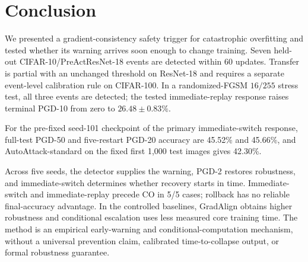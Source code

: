\section{Conclusion}
We presented a gradient-consistency safety trigger for catastrophic
overfitting and tested whether its warning arrives soon enough to change
training. Seven held-out CIFAR-10/PreActResNet-18 events are detected within
60 updates. Transfer is partial with an unchanged threshold on ResNet-18 and
requires a separate event-level calibration rule on CIFAR-100. In a randomized-FGSM
$16/255$ stress test, all three events are detected; the tested immediate-replay
response raises terminal PGD-10 from zero to $26.48\pm0.83\%$.

For the pre-fixed seed-101 checkpoint of the primary immediate-switch response,
full-test PGD-50 and five-restart PGD-20 accuracy are 45.52\% and 45.66\%, and
AutoAttack-standard on the fixed first 1,000 test images gives 42.30\%.

Across five seeds, the detector supplies the warning, PGD-2 restores
robustness, and immediate-switch determines whether recovery starts in time.
Immediate-switch and immediate-replay precede CO in 5/5 cases; rollback has no
reliable final-accuracy advantage. In the controlled
baselines, GradAlign obtains higher robustness and conditional escalation uses
less measured core training time. The method is an empirical early-warning
and conditional-computation mechanism, without a universal prevention claim,
calibrated time-to-collapse output, or formal robustness guarantee.
